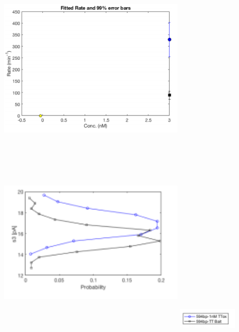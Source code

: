 \documentclass{article}
\begin{document}
  \begin{landscape}
  \begin{multicols}{3}
  
\includegraphics[width=9cm, height=8.9cm]{5} %
\newline
\newline
\includegraphics[width=9cm, height=8.9cm]{3} %
\newline
\includegraphics[height=1cm]{6} %
  

\end{multicols}
\end{landscape}
\end{document}
